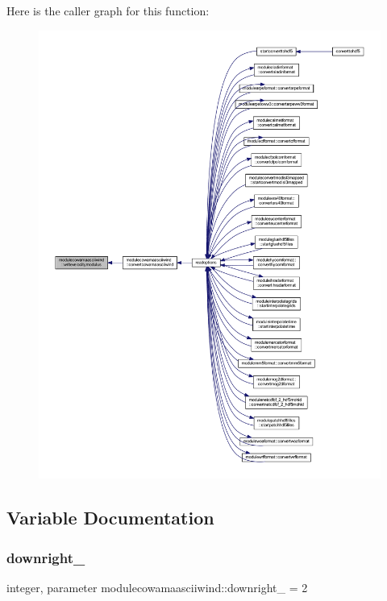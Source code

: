 Here is the caller graph for this function\+:\nopagebreak
\begin{figure}[H]
\begin{center}
\leavevmode
\includegraphics[width=350pt]{namespacemodulecowamaasciiwind_af4f03b22c10470dbdcdaa2f8ab7713d9_icgraph}
\end{center}
\end{figure}


\subsection{Variable Documentation}
\mbox{\label{namespacemodulecowamaasciiwind_a67c52eb5a4004f3fce04141135430ceb}} 
\subsubsection{\texorpdfstring{downright\+\_\+}{downright\_}}
{\footnotesize\ttfamily integer, parameter modulecowamaasciiwind\+::downright\+\_\+ = 2\hspace{0.3cm}{\ttfamily [private]}}


